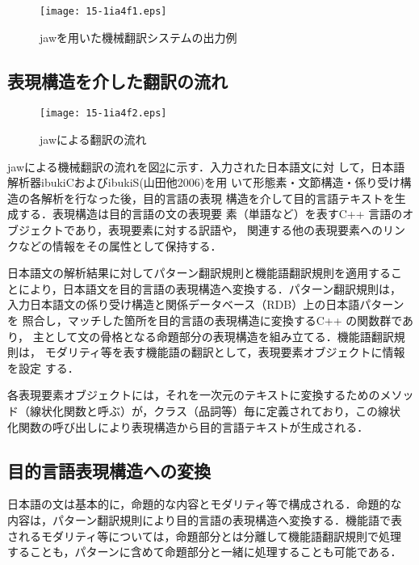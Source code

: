 \documentclass[japanese]{jnlp_1.4}
\begin{document}
\begin{figure}[b]
  \centering
      \texttt{[image: 15-1ia4f1.eps]}
  \caption{jawを用いた機械翻訳システムの出力例}
  \label{fig:Chinese-Vietnamese}
\end{figure}



\subsection{表現構造を介した翻訳の流れ}

\begin{figure}[t]
  \centering
      \texttt{[image: 15-1ia4f2.eps]}
  \caption{jawによる翻訳の流れ}
  \label{fig:jaw}
\end{figure}

jawによる機械翻訳の流れを図\ref{fig:jaw}に示す．入力された日本語文に対
して，日本語解析器ibukiCおよびibukiS(山田他2006)\nocite{Yamada2006}を用
いて形態素・文節構造・係り受け構造の各解析を行なった後，目的言語の表現
構造を介して目的言語テキストを生成する．表現構造は目的言語の文の表現要
素（単語など）を表すC++ 言語のオブジェクトであり，表現要素に対する訳語や，
関連する他の表現要素へのリンクなどの情報をその属性として保持する．


日本語文の解析結果に対してパターン翻訳規則と機能語翻訳規則を適用するこ
とにより，日本語文を目的言語の表現構造へ変換する．パターン翻訳規則は，
入力日本語文の係り受け構造と関係データベース（RDB）上の日本語パターンを
照合し，マッチした箇所を目的言語の表現構造に変換するC++ の関数群であり，
主として文の骨格となる命題部分の表現構造を組み立てる．機能語翻訳規則は，
モダリティ等を表す機能語の翻訳として，表現要素オブジェクトに情報を設定
する．

各表現要素オブジェクトには，それを一次元のテキストに変換するためのメソッ
ド（線状化関数と呼ぶ）が，クラス（品詞等）毎に定義されており，この線状
化関数の呼び出しにより表現構造から目的言語テキストが生成される．



\subsection{目的言語表現構造への変換}

日本語の文は基本的に，命題的な内容とモダリティ等で構成される．命題的な
内容は，パターン翻訳規則により目的言語の表現構造へ変換する．機能語で表
されるモダリティ等については，命題部分とは分離して機能語翻訳規則で処理
することも，パターンに含めて命題部分と一緒に処理することも可能である．
\end{document}
